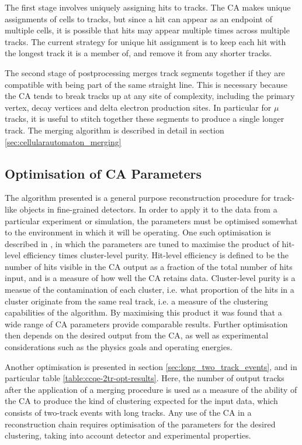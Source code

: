The first stage involves uniquely assigning hits to tracks. The \ac{CA} makes unique assignments of cells to tracks, but since a hit can appear as an endpoint of multiple cells, it is possible that hits may appear multiple times across multiple tracks. The current strategy for unique hit assignment is to keep each hit with the longest track it is a member of, and remove it from any shorter tracks.

The second stage of postprocessing merges track segments together if they are compatible with being part of the same straight line. This is necessary because the CA tends to break tracks up at any site of complexity, including the primary vertex, decay vertices and delta electron production sites. In particular for $\mu$ tracks, it is useful to stitch together these segments to produce a single longer track. The merging algorithm is described in detail in section \ref{sec:cellularautomaton_merging}

\subsection{Optimisation of CA Parameters}\label{sec:optimisation_ca_parameters}
The algorithm presented is a general purpose reconstruction procedure for track-like objects in fine-grained detectors. In order to apply it to the data from a particular experiment or simulation, the parameters must be optimised somewhat to the environment in which it will be operating. One such optimisation is described in \citep{Back2013}, in which the parameters are tuned to maximise the product of hit-level efficiency times cluster-level purity. Hit-level efficiency is defined to be the number of hits visible in the CA output as a fraction of the total number of hits input, and is a measure of how well the CA retains data. Cluster-level purity is a measue of the contamination of each cluster, i.e. what proportion of the hits in a cluster originate from the same real track, i.e. a measure of the clustering capabilities of the algorithm. By maximising this product it was found that a wide range of CA parameters provide comparable results. Further optimisation then depends on the desired output from the CA, as well as experimental considerations such as the physics goals and operating energies.

Another optimisation is presented in section \ref{sec:long_two_track_events}, and in particular table \ref{table:ccqe-2tr-opt-results}. Here, the number of output tracks after the application of a merging procedure is used as a measure of the ability of the CA to produce the kind of clustering expected for the input data, which consists of two-track events with long tracks. Any use of the CA in a reconstruction chain requires optimisation of the parameters for the desired clustering, taking into account detector and experimental properties.

